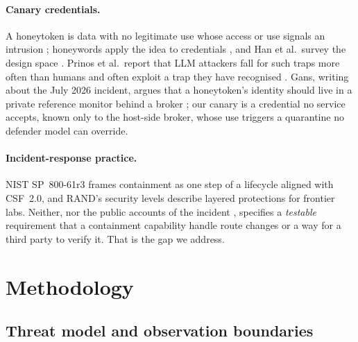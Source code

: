 \documentclass[10pt,a4paper]{article}
\begin{document}
\paragraph{Canary credentials.}
A honeytoken is data with no legitimate use whose access or use signals an intrusion \citep{spitzner2003honeytokens}; honeywords apply the idea to credentials \citep{juels2013honeywords}, and Han et al.\ survey the design space \citep{han2018deception}. Prinos et al.\ report that LLM attackers fall for such traps more often than humans and often exploit a trap they have recognised \citep{prinos2026honeyquest}. Gans, writing about the July 2026 incident, argues that a honeytoken's identity should live in a private reference monitor behind a broker \citep{gans2026honeytokens}; our canary is a credential no service accepts, known only to the host-side broker, whose use triggers a quarantine no defender model can override.

\paragraph{Incident-response practice.}
NIST SP~800-61r3 \citep{nist2025ir} frames containment as one step of a lifecycle aligned with CSF~2.0, and RAND's security levels \citep{nevo2024securing} describe layered protections for frontier labs. Neither, nor the public accounts of the incident \citep{openai2026joint,openai2026road,hf2026incident,kane2026evidence,metr2026investigation}, specifies a \emph{testable} requirement that a containment capability handle route changes or a way for a third party to verify it. That is the gap we address.

\section{Methodology}\label{sec:method}

\subsection{Threat model and observation boundaries}\label{sec:threat}
\end{document}
